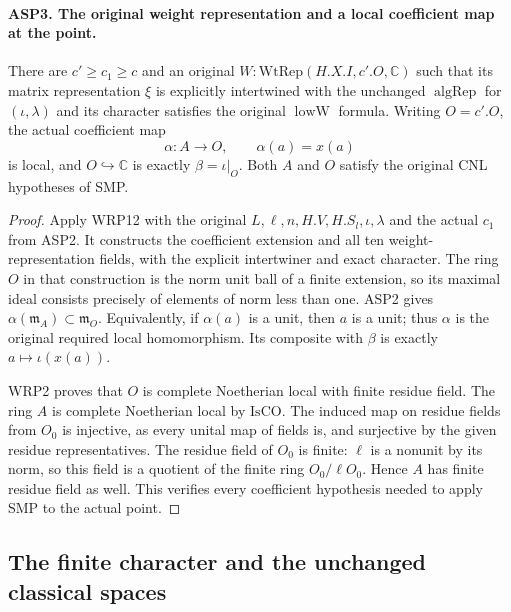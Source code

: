 \paragraph{ASP3. The original weight representation and a local coefficient map at the point.}
\label{claim:ASP3}
There are $c'\geq c_1\geq c$ and an original
$W:\mathrm{WtRep}(H.X.I,c'.O,\mathbb C)$ such that
its matrix representation $\xi$ is explicitly
intertwined with the unchanged $\operatorname{algRep}$
for $(\iota,\lambda)$ and its character satisfies
the original $\operatorname{lowW}$ formula.
Writing $O=c'.O$, the actual coefficient map
\[
                \alpha:A\longrightarrow O,
                        \qquad\alpha(a)=x(a)
\]
is local, and $O\hookrightarrow\mathbb C$ is exactly
$\beta=\iota|_O$.  Both $A$ and $O$ satisfy
the original CNL hypotheses of SMP.
\begin{proof}
Apply WRP12 with the original
$L,\ell,n,H.V,H.S_l,\iota,\lambda$ and the actual
$c_1$ from ASP2.  It constructs the coefficient
extension and all ten weight-representation fields,
with the explicit intertwiner and exact character.
The ring $O$ in that construction is the norm unit
ball of a finite extension, so its maximal ideal
consists precisely of elements of norm less than
one.  ASP2 gives
$\alpha(\mathfrak m_A)\subset\mathfrak m_O$.
Equivalently, if $\alpha(a)$ is a unit, then $a$
is a unit; thus $\alpha$ is the original required
local homomorphism.  Its composite with $\beta$
is exactly $a\mapsto\iota(x(a))$.

WRP2 proves that $O$ is complete Noetherian local
with finite residue field.  The ring $A$ is complete
Noetherian local by $\mathrm{IsCO}$.  The induced
map on residue fields from $O_0$ is injective,
as every unital map of fields is, and surjective
by the given residue representatives.  The
residue field of $O_0$ is finite: $\ell$ is a
nonunit by its norm, so this field is a quotient
of the finite ring $O_0/\ell O_0$.
Hence $A$ has finite residue field as well.
This verifies every coefficient hypothesis
needed to apply SMP to the actual point.
\end{proof}

\subsection{The finite character and the unchanged classical spaces}

